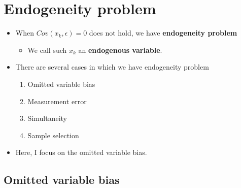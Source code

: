 \documentclass[]{book}
\providecommand{\tightlist}{%
  \setlength{\itemsep}{0pt}\setlength{\parskip}{0pt}}
\begin{document}
\section{Endogeneity problem}\label{endogeneity-problem}

\begin{itemize}
\tightlist
\item
  When \(Cov(x_k, \epsilon)=0\) does not hold, we have
  \textbf{endogeneity problem}

  \begin{itemize}
  \tightlist
  \item
    We call such \(x_k\) an \textbf{endogenous variable}.
  \end{itemize}
\item
  There are several cases in which we have endogeneity problem

  \begin{enumerate}
  \def\labelenumi{\arabic{enumi}.}
  \tightlist
  \item
    Omitted variable bias
  \item
    Measurement error
  \item
    Simultaneity
  \item
    Sample selection
  \end{enumerate}
\item
  Here, I focus on the omitted variable bias.
\end{itemize}

\subsection{Omitted variable bias}\label{omitted-variable-bias}
\end{document}
